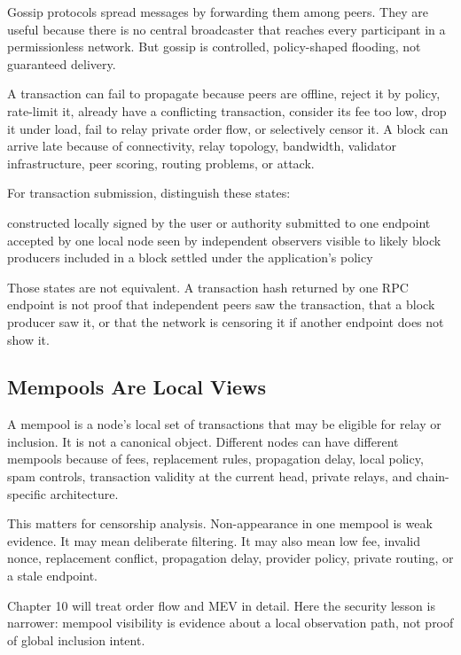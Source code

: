 Gossip protocols spread messages by forwarding them among peers. They are useful because there is no central broadcaster that reaches every participant in a permissionless network. But gossip is controlled, policy-shaped flooding, not guaranteed delivery.

A transaction can fail to propagate because peers are offline, reject it by policy, rate-limit it, already have a conflicting transaction, consider its fee too low, drop it under load, fail to relay private order flow, or selectively censor it. A block can arrive late because of connectivity, relay topology, bandwidth, validator infrastructure, peer scoring, routing problems, or attack.

For transaction submission, distinguish these states:

\begin{codeblock}
constructed locally
signed by the user or authority
submitted to one endpoint
accepted by one local node
seen by independent observers
visible to likely block producers
included in a block
settled under the application's policy
\end{codeblock}

Those states are not equivalent. A transaction hash returned by one RPC endpoint is not proof that independent peers saw the transaction, that a block producer saw it, or that the network is censoring it if another endpoint does not show it.

\subsection{Mempools Are Local Views}

A mempool is a node's local set of transactions that may be eligible for relay or inclusion. It is not a canonical object. Different nodes can have different mempools because of fees, replacement rules, propagation delay, local policy, spam controls, transaction validity at the current head, private relays, and chain-specific architecture.

This matters for censorship analysis. Non-appearance in one mempool is weak evidence. It may mean deliberate filtering. It may also mean low fee, invalid nonce, replacement conflict, propagation delay, provider policy, private routing, or a stale endpoint.

Chapter 10 will treat order flow and MEV in detail. Here the security lesson is narrower: mempool visibility is evidence about a local observation path, not proof of global inclusion intent.

